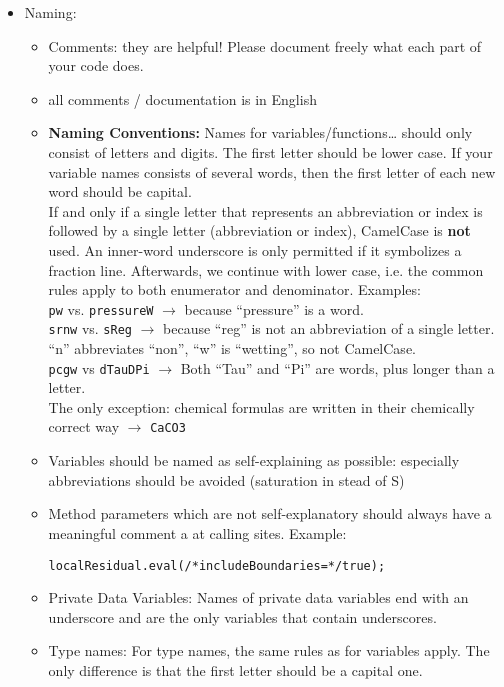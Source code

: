 \begin{itemize}
\item Naming: 
\begin{itemize}
\item Comments: they are helpful! Please document freely what each part of your code does. 
\item all comments / documentation is in English
\item \textbf{Naming Conventions:} Names for variables/functions\ldots \; should only consist of letters and digits. The first
letter should be lower case. If your variable names consists of several words, then 
the first letter of each new word should be capital. \\
If and only if a single letter that represents an abbreviation or index is followed by a single letter (abbreviation or index), CamelCase is {\bf not} used. An inner-word underscore is only permitted if it symbolizes a fraction line. Afterwards, we continue with lower case, i.e. the common rules apply to both enumerator and denominator. Examples: \\
\texttt{pw} vs. \texttt{pressureW} $\rightarrow$ because ``pressure'' is a word.\\
\texttt{srnw} vs. \texttt{sReg} $\rightarrow$ because ``reg'' is not an abbreviation of a single letter. ``n'' abbreviates ``non'', ``w'' is ``wetting'', so not CamelCase.\\
\texttt{pcgw} vs \texttt{dTauDPi} $\rightarrow$ Both ``Tau'' and ``Pi'' are words, plus longer than a letter.\\
The only exception: chemical formulas are written in their chemically correct way $\rightarrow$ \texttt{CaCO3}
\item Variables should be named as self-explaining as possible: especially abbreviations 
should be avoided (saturation in stead of S)
\item Method parameters which are not self-explanatory should always
  have a meaningful comment a at calling sites. Example:
\begin{lstlisting}[style=DumuxCode]
   localResidual.eval(/*includeBoundaries=*/true);
\end{lstlisting}
\item Private Data Variables: Names of private data variables end with an underscore and are the only variables that contain underscores. 
\item Type names: For type names, the same rules as for variables apply. The only difference is that the first letter should be a capital one.

\end{itemize}
\end{itemize}
